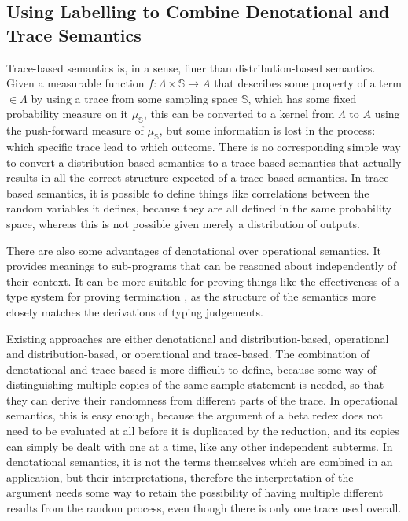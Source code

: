 \documentclass[titlepage]{article}
\begin{document}
\subsection{Using Labelling to Combine Denotational and Trace Semantics}
Trace-based semantics is, in a sense, finer than distribution-based semantics. Given a measurable function $f : \Lambda \times \mathbb S \to A$ that describes some property of a term $\in \Lambda$ by using a trace from some sampling space $\mathbb S$, which has some fixed probability measure on it $\mu_{\mathbb S}$, this can be converted to a kernel from $\Lambda$ to $A$ using the push-forward measure of $\mu_{\mathbb S}$, but some information is lost in the process: which specific trace lead to which outcome. There is no corresponding simple way to convert a distribution-based semantics to a trace-based semantics that actually results in all the correct structure expected of a trace-based semantics. In trace-based semantics, it is possible to define things like correlations between the random variables it defines, because they are all defined in the same probability space, whereas this is not possible given merely a distribution of outputs.

There are also some advantages of denotational over operational semantics. It provides meanings to sub-programs that can be reasoned about independently of their context. It can be more suitable for proving things like the effectiveness of a type system for proving termination , as the structure of the semantics more closely matches the derivations of typing judgements.%

Existing approaches are either denotational and distribution-based, operational and distribution-based, or operational and trace-based. The combination of denotational and trace-based is more difficult to define, because some way of distinguishing multiple copies of the same sample statement is needed, so that they can derive their randomness from different parts of the trace. In operational semantics, this is easy enough, because the argument of a beta redex does not need to be evaluated at all before it is duplicated by the reduction, and its copies can simply be dealt with one at a time, like any other independent subterms. In denotational semantics, it is not the terms themselves which are combined in an application, but their interpretations, therefore the interpretation of the argument needs some way to retain the possibility of having multiple different results from the random process, even though there is only one trace used overall.
\end{document}
